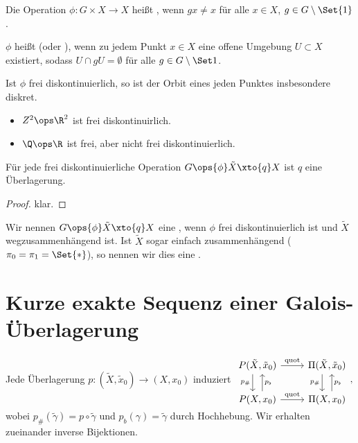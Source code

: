 \begin{df}
    Die Operation $\phi: G \times X \to X$ heißt , wenn $gx \neq x$ für alle $x \in X$, $g \in G \setminus \Set{1}$.

    $\phi$ heißt  (oder ), wenn zu jedem Punkt $x \in X$ eine offene Umgebung $U \subset X$ existiert, sodass $U \cap gU = \emptyset$ für alle $g \in G \setminus \Set 1$.
    \begin{note}
        Ist $\phi$ frei diskontinuierlich, so ist der Orbit eines jeden Punktes insbesondere diskret.
    \end{note}
\end{df}

\begin{ex}
    \begin{itemize}
        \item
            $Z^2 \ops \R^2$ ist frei diskontinuirlich.
        \item
            $\Q \ops \R$ ist frei, aber nicht frei diskontinuierlich.
    \end{itemize}
\end{ex}

\begin{st}
    Für jede frei diskontinuierliche Operation $G \ops{\phi} \tilde X \xto{q} X$ ist $q$ eine Überlagerung.
    \begin{proof}
        klar.
    \end{proof}
\end{st}

\begin{df}
    Wir nennen $G \ops{\phi} \tilde X \xto{q} X$ eine , wenn $\phi$ frei diskontinuierlich ist und $\tilde X$ wegzusammenhängend ist.
    Ist $\tilde X$ sogar einfach zusammenhängend ($\pi_0 = \pi_1 = \Set{*}$), so nennen wir dies eine .
\end{df}


\section{Kurze exakte Sequenz einer Galois-Überlagerung}


\begin{st}
    Jede Überlagerung $p: (\tilde X, \tilde x_0) \to (X, x_0)$ induziert
    \begin{math}
        \begin{tikzcd}
            P(\tilde X, \tilde x_0) \ar[d,"p_\#",xshift=-0.5em,swap] \ar[r,"\quot"] & \Pi(\tilde X, \tilde x_0) \ar[d,"p_\#",xshift=-0.5em,swap] \\
            P(X, x_0) \ar[u,"p_\b",xshift=0.5em,swap] \ar[r,"\quot"] & \Pi(X, x_0) \ar[u, "p_\b",xshift=0.5em,swap]
        \end{tikzcd},
    \end{math}
    wobei $p_\#(\tilde \gamma) = p \circ \tilde \gamma$ und $p_b(\gamma) = \tilde \gamma$ durch Hochhebung.
    Wir erhalten zueinander inverse Bijektionen.
\end{st}

